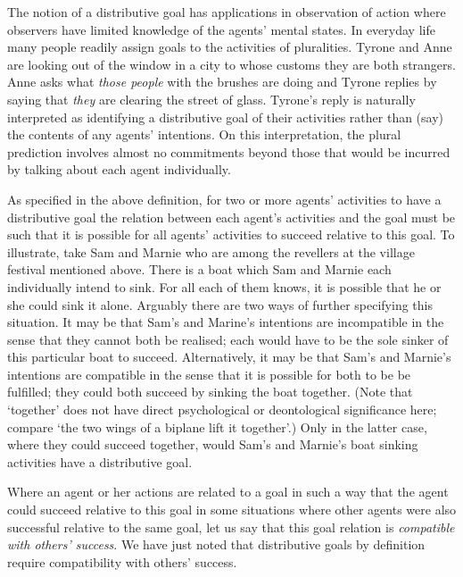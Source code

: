 \documentclass[12pt,a4paper]{extarticle}
\begin{document}
The notion of a distributive goal has applications in observation of action where observers have limited knowledge  of the agents' mental states.
In everyday life many people readily assign goals to the activities of pluralities.  
Tyrone and Anne are looking out of the window in a city to whose customs they are both strangers.  Anne asks what \emph{those people} with the brushes are doing and Tyrone replies by saying that \emph{they} are clearing the street of glass.
Tyrone's reply is naturally interpreted as identifying a distributive goal of their activities rather than (say) the contents of any agents' intentions.
On this interpretation, the plural prediction involves almost no commitments beyond those that would be incurred by talking about each agent individually.

As specified in the above definition, 
	for two or more agents' activities to have a distributive goal 
	the relation between each agent's activities and the goal must be such that it is possible for all agents' activities to succeed relative to this goal.
To illustrate, take Sam and Marnie who are among the revellers at the village festival mentioned above.  There is a boat which Sam and Marnie each individually intend to sink.  
For all each of them knows, it is possible that he or she could sink it alone.
Arguably there are two ways of further specifying this situation.  It may be that Sam's and Marine's intentions are incompatible in the sense that they cannot both be realised; each would have to be the sole sinker of this particular boat to succeed.   Alternatively, it may be that Sam's and Marnie's intentions are compatible in the sense that it is possible for both to be be fulfilled; they could both succeed by sinking the boat together.  
(Note that `together'  does not have direct psychological or deontological significance here; compare `the two wings of a biplane lift it together'.)
Only in the latter case, where they could succeed together, 
 would Sam's and Marnie's boat sinking activities have a distributive goal.


Where an agent or her actions are related to a goal in such a way that the agent could succeed relative to this goal in some situations where other agents were also successful relative to the same goal, let us say that this goal relation is \emph{compatible with others' success}.   
We have just noted that distributive goals by definition require compatibility with others' success.
\end{document}
